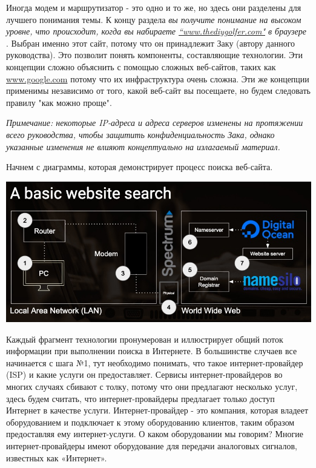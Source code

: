 \documentclass{report}
\begin{document}
Иногда модем и маршрутизатор - это одно и то же, но здесь они разделены
для лучшего понимания темы. К концу раздела \emph{вы получите понимание
на высоком уровне, что происходит, когда вы набираете
\href{http://www.thediygolfer.com}{``www.thediygolfer.com"} в браузере}
. Выбран именно этот сайт, потому что он принадлежит Заку (автору
данного руководства). Это позволит понять компоненты, составляющие
технологии. Эти концепции сложно объяснить с помощью сложных веб-сайтов,
таких как \href{http://www.google.com}{www.google.com} потому что их
инфраструктура очень сложна. Эти же концепции применимы независимо от
того, какой веб-сайт вы посещаете, но будем следовать правилу "как можно
проще".

\emph{Примечание: некоторые IP-адреса и адреса серверов изменены на
протяжении всего руководства, чтобы защитить конфиденциальность Зака,
однако указанные изменения не влияют концептуально на излагаемый
материал.}

Начнем с диаграммы, которая демонстрирует процесс поиска веб-сайта.

\includegraphics{blog/2019/bash-essentials/basic-web-search.jpg}

Каждый фрагмент технологии пронумерован и иллюстрирует общий поток
информации при выполнении поиска в Интернете. В большинстве случаев все
начинается с шага №1, тут необходимо понимать, что такое
интернет-провайдер (ISP) и какие услуги он предоставляет. Сервисы
интернет-провайдеров во многих случаях сбивают с толку, потому что они
предлагают несколько услуг, здесь будем считать, что интернет-провайдеры
предлагает только доступ Интернет в качестве услуги. Интернет-провайдер
- это компания, которая владеет оборудованием и подключает к этому
оборудованию клиентов, таким образом предоставляя ему интернет-услуги. О
каком оборудовании мы говорим? Многие интернет-провайдеры имеют
оборудование для передачи аналоговых сигналов, известных как «Интернет».
\end{document}
